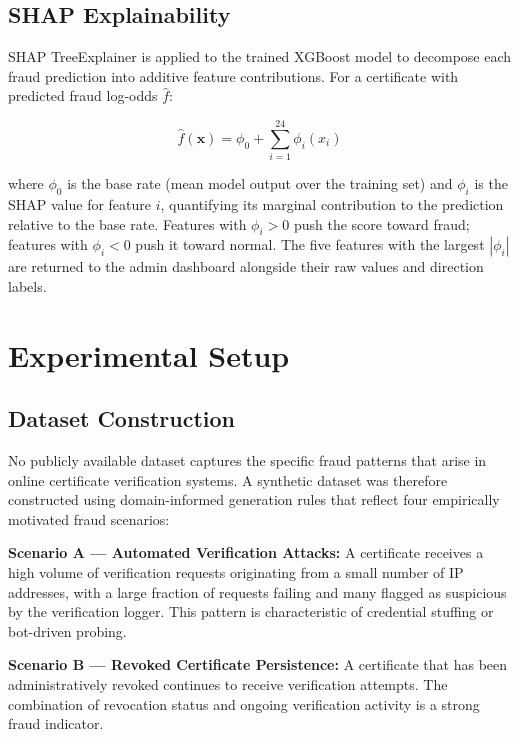 \documentclass[conference]{IEEEtran}
\begin{document}
\subsection{SHAP Explainability}

SHAP TreeExplainer is applied to the trained XGBoost model to
decompose each fraud prediction into additive feature contributions.
For a certificate with predicted fraud log-odds $\hat{f}$:

\begin{equation}
\hat{f}(\mathbf{x}) = \phi_0 + \sum_{i=1}^{24} \phi_i(x_i)
\label{eq:shap}
\end{equation}

where $\phi_0$ is the base rate (mean model output over the training
set) and $\phi_i$ is the SHAP value for feature $i$, quantifying
its marginal contribution to the prediction relative to the base
rate. Features with $\phi_i > 0$ push the score toward fraud;
features with $\phi_i < 0$ push it toward normal. The five features
with the largest $|\phi_i|$ are returned to the admin dashboard
alongside their raw values and direction labels.

\section{Experimental Setup}

\subsection{Dataset Construction}

No publicly available dataset captures the specific fraud patterns
that arise in online certificate verification systems. A synthetic
dataset was therefore constructed using domain-informed generation
rules that reflect four empirically motivated fraud scenarios:

\textbf{Scenario A — Automated Verification Attacks:}
A certificate receives a high volume of verification requests
originating from a small number of IP addresses, with a large
fraction of requests failing and many flagged as suspicious by the
verification logger. This pattern is characteristic of credential
stuffing or bot-driven probing.

\textbf{Scenario B — Revoked Certificate Persistence:}
A certificate that has been administratively revoked continues to
receive verification attempts. The combination of revocation status
and ongoing verification activity is a strong fraud indicator.
\end{document}
